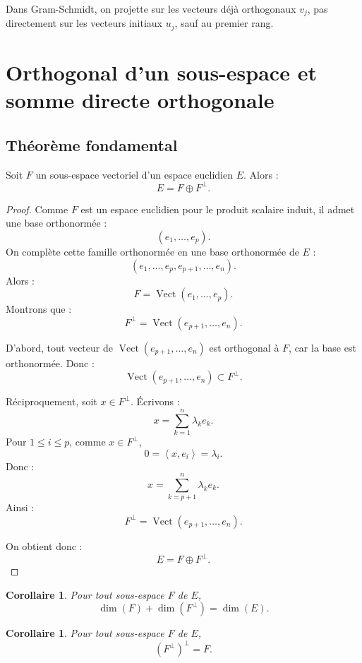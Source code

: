 \documentclass[11pt,a4paper]{article}
\newcommand{\Vect}{\operatorname{Vect}}
\newcommand{\scal}[2]{\left\langle #1,#2\right\rangle}
\newtheorem{corollaire}[prop]{Corollaire}
\begin{document}
\begin{erreurbox}
Dans Gram-Schmidt, on projette sur les vecteurs déjà orthogonaux \(v_j\), pas directement sur les vecteurs initiaux \(u_j\), sauf au premier rang.
\end{erreurbox}

\section{Orthogonal d'un sous-espace et somme directe orthogonale}

\subsection{Théorème fondamental}

\begin{theorembox}
Soit \(F\) un sous-espace vectoriel d'un espace euclidien \(E\).  
Alors :
\[
E=F\oplus F^\perp.
\]
\end{theorembox}

\begin{proof}
Comme \(F\) est un espace euclidien pour le produit scalaire induit, il admet une base orthonormée :
\[
(e_1,\dots,e_p).
\]
On complète cette famille orthonormée en une base orthonormée de \(E\) :
\[
(e_1,\dots,e_p,e_{p+1},\dots,e_n).
\]
Alors :
\[
F=\Vect(e_1,\dots,e_p).
\]
Montrons que :
\[
F^\perp=\Vect(e_{p+1},\dots,e_n).
\]

D'abord, tout vecteur de \(\Vect(e_{p+1},\dots,e_n)\) est orthogonal à \(F\), car la base est orthonormée.  
Donc :
\[
\Vect(e_{p+1},\dots,e_n)\subset F^\perp.
\]

Réciproquement, soit \(x\in F^\perp\).  
Écrivons :
\[
x=\sum_{k=1}^n\lambda_ke_k.
\]
Pour \(1\leq i\leq p\), comme \(x\in F^\perp\),
\[
0=\scal{x}{e_i}=\lambda_i.
\]
Donc :
\[
x=\sum_{k=p+1}^n\lambda_ke_k.
\]
Ainsi :
\[
F^\perp=\Vect(e_{p+1},\dots,e_n).
\]

On obtient donc :
\[
E=F\oplus F^\perp.
\]
\end{proof}

\begin{corollaire}
Pour tout sous-espace \(F\) de \(E\),
\[
\dim(F)+\dim(F^\perp)=\dim(E).
\]
\end{corollaire}

\begin{corollaire}
Pour tout sous-espace \(F\) de \(E\),
\[
(F^\perp)^\perp=F.
\]
\end{corollaire}
\end{document}
